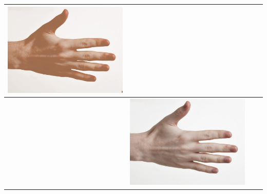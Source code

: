 \begin{longtable}{|N||c|c|c|}
\begin{minipage}{.29\textwidth}
    \includegraphics[width=\textwidth,height=\textheight,keepaspectratio]{../rc_test/outputs/20170517_proportional_corrected_test_alpha10/hand_pale_to_hand_brown.jpg}
  \end{minipage} \\
\hline  \label{row:prop_correct_test_a10_hand_pale_to_hand_light} &
  \begin{minipage}{.29\textwidth}
    \includegraphics[width=\textwidth,height=\textheight,keepaspectratio]{../inputs/hand_pale.jpg}
  \end{minipage} & 
  \begin{minipage}{.29\textwidth}

\end{minipage}
\end{longtable}
